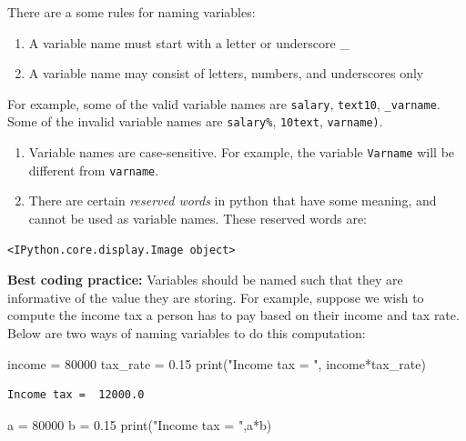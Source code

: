 \documentclass[
  letterpaper,
  DIV=11,
  numbers=noendperiod]{scrreprt}
\newenvironment{Shaded}{\begin{snugshade}}{\end{snugshade}}
\newcommand{\BuiltInTok}[1]{\textcolor[rgb]{0.00,0.23,0.31}{#1}}
\newcommand{\DecValTok}[1]{\textcolor[rgb]{0.68,0.00,0.00}{#1}}
\newcommand{\FloatTok}[1]{\textcolor[rgb]{0.68,0.00,0.00}{#1}}
\newcommand{\NormalTok}[1]{\textcolor[rgb]{0.00,0.23,0.31}{#1}}
\newcommand{\OperatorTok}[1]{\textcolor[rgb]{0.37,0.37,0.37}{#1}}
\newcommand{\StringTok}[1]{\textcolor[rgb]{0.13,0.47,0.30}{#1}}
\begin{document}
There are a some rules for naming variables:

\begin{enumerate}
\def\labelenumi{\arabic{enumi}.}
\item
  A variable name must start with a letter or underscore \_
\item
  A variable name may consist of letters, numbers, and underscores only
\end{enumerate}

For example, some of the valid variable names are \texttt{salary},
\texttt{text10}, \texttt{\_varname}. Some of the invalid variable names
are \texttt{salary\%}, \texttt{10text}, \texttt{varname)}.

\begin{enumerate}
\def\labelenumi{\arabic{enumi}.}
\setcounter{enumi}{2}
\item
  Variable names are case-sensitive. For example, the variable
  \texttt{Varname} will be different from \texttt{varname}.
\item
  There are certain \emph{reserved words} in python that have some
  meaning, and cannot be used as variable names. These reserved words
  are:
\end{enumerate}

\begin{verbatim}
<IPython.core.display.Image object>
\end{verbatim}

\textbf{Best coding practice:} Variables should be named such that they
are informative of the value they are storing. For example, suppose we
wish to compute the income tax a person has to pay based on their income
and tax rate. Below are two ways of naming variables to do this
computation:

\begin{Shaded}
\begin{Highlighting}[]
\NormalTok{income }\OperatorTok{=} \DecValTok{80000}
\NormalTok{tax\_rate }\OperatorTok{=} \FloatTok{0.15}
\BuiltInTok{print}\NormalTok{(}\StringTok{"Income tax = "}\NormalTok{, income}\OperatorTok{*}\NormalTok{tax\_rate)}
\end{Highlighting}
\end{Shaded}

\begin{verbatim}
Income tax =  12000.0
\end{verbatim}

\begin{Shaded}
\begin{Highlighting}[]
\NormalTok{a }\OperatorTok{=} \DecValTok{80000}
\NormalTok{b }\OperatorTok{=} \FloatTok{0.15}
\BuiltInTok{print}\NormalTok{(}\StringTok{"Income tax = "}\NormalTok{,a}\OperatorTok{*}\NormalTok{b)}
\end{Highlighting}
\end{Shaded}
\end{document}
